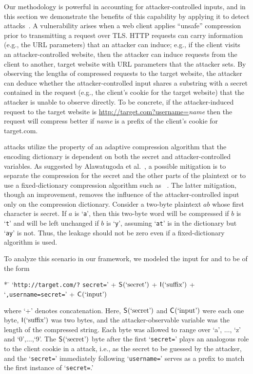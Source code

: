 Our methodology is powerful in accounting for attacker-controlled
inputs, and in this section we demonstrate the benefits of this
capability by applying it to detect \crime
attacks~\cite{Kelsey:2002:CIL:647937.741226,Alawatugoda2015}.  A
\crime vulnerability arises when a web client applies ``unsafe''
compression prior to transmitting a request over TLS.  HTTP requests
can carry information (e.g., the URL parameters) that an attacker can
induce; e.g., if the client visits an attacker-controlled website,
then the attacker can induce requests from the client to another,
target website with URL parameters that the attacker sets.  By
observing the lengths of compressed requests to the target website,
the attacker can deduce whether the attacker-controlled input shares a
substring with a secret contained in the request (e.g., the client's
cookie for the target website) that the attacker is unable to observe
directly.  To be concrete, if the attacker-induced request to the
target website is \url{http://target.com?username=}\textit{name} then
the request will compress better if \textit{name} is a prefix of the
client's cookie for target.com.

\crime attacks utilize the property of an adaptive compression
algorithm that the encoding dictionary is dependent on both the secret
and attacker-controlled variables.  As suggested by Alawatugoda et
al.~\cite{Alawatugoda2015}, a possible mitigation is to separate the
compression for the secret and the other parts of the plaintext or to
use a fixed-dictionary compression algorithm such as
\smaz~\cite{smaz}.  The latter mitigation, though an improvement,
removes the influence of the attacker-controlled input only on the
compression dictionary.  Consider a two-byte plaintext $ab$ whose
first character is secret.  If $a$ is `\texttt{a}', then this two-byte
word will be compressed if $b$ is `\texttt{t}' and will be left
unchanged if $b$ is `\texttt{y}', assuming `\texttt{at}' is in the
dictionary but `\texttt{ay}' is not.  Thus, the leakage should not
be zero even if a fixed-dictionary algorithm is used.

To analyze this scenario in our framework, we modeled the input for
\gzip and \smaz to be of the form
{\small
\begin{tabbing}
  * \= \kill
  \> `\texttt{http://target.com/?} \= \texttt{secret=}' +
  $\mathsf{S}_{}(\textrm{`secret'})$ + $\mathsf{I}_{}(\textrm{`suffix'})$ 
   + `\texttt{,username=secret=}' + $\mathsf{C}_{}(\textrm{`input'})$
\end{tabbing}
}
\noindent
where `+' denotes concatenation.  Here, $\mathsf{S}_{}(\textrm{`secret'})$ and
$\mathsf{C}_{}(\textrm{`input'})$ were each one byte,
$\mathsf{I}_{}(\textrm{`suffix'})$ was two bytes, and the
attacker-observable variable was the length of the compressed string.
Each byte was allowed to range over `a', $\ldots$, `z' and
`0',$\ldots$,`9'.  The $\mathsf{S}_{}(\textrm{`secret'})$ byte after the first
`\texttt{secret=}' plays an analogous role to the client cookie in a
\crime attack, i.e., as the secret to be guessed by the attacker, and
the `\texttt{secret=}' immediately following `\texttt{username=}'
serves as a prefix to match the first instance of `\texttt{secret=}.'


